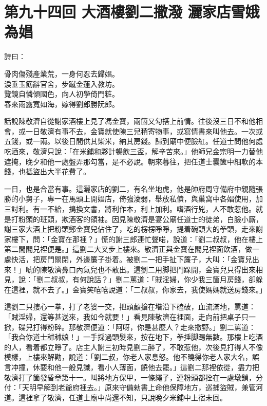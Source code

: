 
\chapter*{第九十四回 大酒樓劉二撒潑 灑家店雪娥為娼}


詩曰：

\begin{myquote}
骨肉傷殘產業荒，一身何忍去歸娼。\\淚垂玉筯辭官舍，步蹴金蓮入教坊。\\覽鏡自憐傾國色，向人初學倚門粧。\\春來雨露寬如海，嫁得劉郎勝阮郎。
\end{myquote}

話說陳敬濟自從謝家酒樓上見了馮金寶，兩箇又勾搭上前情。往後沒三日不和他相會，或一日敬濟有事不去，金寶就使陳三兒稍寄物事，或寫情書來叫他去。一次或五錢，或一兩。以後日間供其柴米，納其房錢。歸到廟中便臉紅。任道士問他何處吃酒來，敬濟只說：「在米鋪和夥計暢飲三盃，解辛苦來。」他師兄金宗明一力替他遮掩，晚夕和他一處盤弄那勾當，是不必說。朝來暮往，把任道士囊篋中細軟的本錢，也抵盜出大半花費了。

一日，也是合當有事。這灑家店的劉二，有名坐地虎，他是帥府周守備府中親隨張勝的小舅子，專一在馬頭上開娼店，倚強淩弱，舉放私債，與巢窩中各娼使用，加三討利。有一不給，搗換文書，將利作本，利上加利。嗜酒行兇，人不敢惹他。就是打粉頭的班頭，欺酒客的領袖。因見陳敬濟是宴公廟任道士的徒弟，白臉小厮，謝三家大酒上把粉頭鄭金寶兒佔住了，吃的楞楞睜睜，提着碗頭大的拳頭，{}走來謝家樓下，問：「金寶在那裡？」慌的謝三郎連忙聲喏，說道：「劉二叔叔，他在樓上第二間閣兒裡便是。」這劉二大叉步上樓來。敬濟正與金寶在閣兒裡面飲酒，做一處快活，把房門關閉，外邊簾子掛着。被劉二一把手扯下簾子，大叫：「金寶兒出來！」唬的陳敬濟鼻口內氣兒也不敢出。這劉二用脚把門跺開，金寶兒只得出來相見，說：「劉二叔叔，有何說話？」劉二罵道：「賊淫婦，你少我三箇月房錢，卻躲在這裡，就不去了。」金寶笑嘻嘻說道：「二叔叔，你家去，我使媽媽就送房錢來。」

這劉二只摟心一拳，打了老婆一交，把頭顱搶在堦沿下磕破，血流滿地，罵道：「賊淫婦，還等甚送來，我如今就要！」看見陳敬濟在裡面，走向前把桌子只一掀，碟兒打得粉碎。那敬濟便道：「阿呀，你是甚麼人？走來撒野。」劉二罵道：「我㒲你道士秫秫娘！」一手採過頭髮來，按在地下，拳捶脚踢無數。那樓上吃酒的人，看着都立睜了。店主人謝三初時見劉二醉了，不敢惹他，次後見打得人不像模樣，上樓來解勸，說道：「劉二叔，你老人家息怒。他不曉得你老人家大名，誤言冲撞，休要和他一般見識，看小人薄面，饒他去罷。」這劉二那裡依從，盡力把敬濟打了箇發昏章第十一。叫將地方保甲，一條繩子，連粉頭都拴在一處墩鎖，分付：「天明早解到老爺府裡去。」原來守備勑書上命他保障地方，巡捕盜賊，兼管河道。這裡拿了敬濟，任道士廟中尚還不知，只說晚夕米鋪中上宿未回。

